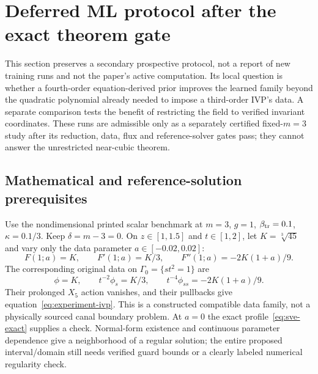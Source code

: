 
\section{Deferred ML protocol after the exact theorem gate}
\label{sec:next-experiment}
This section preserves a secondary prospective protocol, not a report of new
training runs and not the paper's active computation. Its local question is
whether a fourth-order equation-derived prior improves the learned family
beyond the quadratic polynomial already needed to impose a third-order IVP's
data. A separate comparison tests the benefit of restricting the field to
verified invariant coordinates. These runs are admissible only as a separately
certified fixed-$m=3$ study after its reduction, data, flux and reference-solver
gates pass; they cannot answer the unrestricted near-cubic theorem.

\subsection{Mathematical and reference-solution prerequisites}
Use the nondimensional printed scalar benchmark at
$m=3$, $g=1$, $\beta_{\rm tr}=0.1$, $\kappa=0.1/3$.
Keep $\delta=m-3=0$. On $z\in[1,1.5]$ and $t\in[1,2]$, let
$K=\sqrt[3]{45}$ and vary only the data parameter $a\in[-0.02,0.02]$:
\begin{equation}
 F(1;a)=K,\qquad F'(1;a)=K/3,\qquad
 F''(1;a)=-2K(1+a)/9.
 \label{eq:experiment-ivp}
\end{equation}
The corresponding original data on $\Gamma_0=\{st^2=1\}$ are
\begin{equation}
 \phi=K,\qquad t^{-2}\phi_s=K/3,\qquad
 t^{-4}\phi_{ss}=-2K(1+a)/9.
 \label{eq:experiment-original-data}
\end{equation}
Their prolonged $X_5$ action vanishes, and their pullbacks give
equation~\eqref{eq:experiment-ivp}. This is a constructed compatible data
family, not a physically sourced canal boundary problem. At $a=0$ the exact
profile~\eqref{eq:sve-exact} supplies a check. Normal-form existence and
continuous parameter dependence give a neighborhood of a regular solution;
the entire proposed interval/domain still needs verified guard bounds or a
clearly labeled numerical regularity check.

